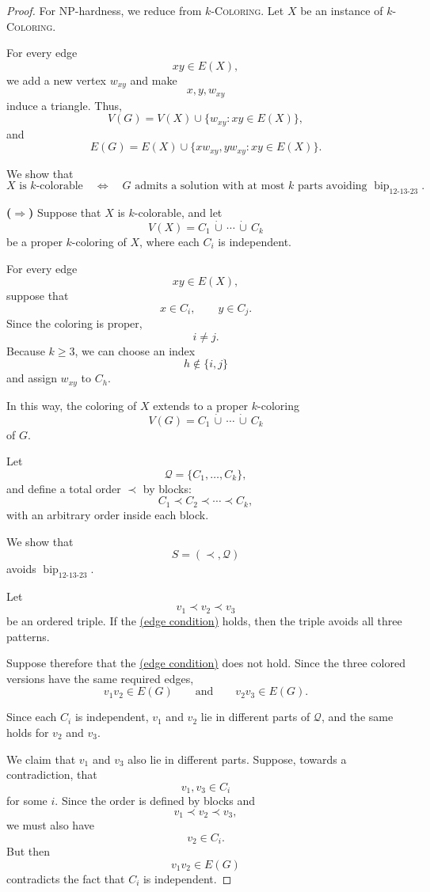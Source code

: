 \documentclass[12pt]{article}
\theoremstyle{plain}
\theoremstyle{definition}
\theoremstyle{remark}
\theoremstyle{definition}
\newcommand{\edgecondition}{%
  \hyperref[def:avoid:cond:edge]{(edge condition)}\xspace
}
\newcommand{\biplabel}{\mathrm{bip}}
\DeclareRobustCommand{\bipparam}[1]{%
  \ensuremath{\mathop{\biplabel}\nolimits_{#1}}%
}
\begin{document}
\begin{proof}
For NP-hardness, we reduce from \(k\)-\textsc{Coloring}.
Let \(X\) be an instance of \(k\)-\textsc{Coloring}.

For every edge
\[
xy\in E(X),
\]
we add a new vertex \(w_{xy}\) and make
\[
x,y,w_{xy}
\]
induce a triangle. Thus,
\[
V(G)
=
V(X)\cup\{w_{xy}:xy\in E(X)\},
\]
and
\[
E(G)
=
E(X)\cup
\{xw_{xy},yw_{xy}:xy\in E(X)\}.
\]

We show that
\[
X\text{ is \(k\)-colorable}
\quad\Longleftrightarrow\quad
G\text{ admits a solution with at most \(k\) parts avoiding }
\bipparam{12\text{-}13\text{-}23}.
\]

\medskip
\noindent\textbf{(\(\Rightarrow\))}
Suppose that \(X\) is \(k\)-colorable, and let
\[
V(X)=C_1\,\dot\cup\,\cdots\,\dot\cup\,C_k
\]
be a proper \(k\)-coloring of \(X\), where each \(C_i\) is independent.

For every edge
\[
xy\in E(X),
\]
suppose that
\[
x\in C_i,
\qquad
y\in C_j.
\]
Since the coloring is proper,
\[
i\neq j.
\]
Because \(k\ge3\), we can choose an index
\[
h\notin\{i,j\}
\]
and assign \(w_{xy}\) to \(C_h\).

In this way, the coloring of \(X\) extends to a proper \(k\)-coloring
\[
V(G)=C_1\,\dot\cup\,\cdots\,\dot\cup\,C_k
\]
of \(G\).

Let
\[
\mathcal Q=\{C_1,\dots,C_k\},
\]
and define a total order \(\prec\) by blocks:
\[
C_1\prec C_2\prec\cdots\prec C_k,
\]
with an arbitrary order inside each block.

We show that
\[
S=(\prec,\mathcal Q)
\]
avoids \(\bipparam{12\text{-}13\text{-}23}\).

Let
\[
v_1\prec v_2\prec v_3
\]
be an ordered triple. If the \edgecondition{} holds, then the triple avoids
all three patterns.

Suppose therefore that the \edgecondition{} does not hold. Since the three
colored versions have the same required edges,
\[
v_1v_2\in E(G)
\qquad\text{and}\qquad
v_2v_3\in E(G).
\]

Since each \(C_i\) is independent, \(v_1\) and \(v_2\) lie in different
parts of \(\mathcal Q\), and the same holds for \(v_2\) and \(v_3\).

We claim that \(v_1\) and \(v_3\) also lie in different parts. Suppose,
towards a contradiction, that
\[
v_1,v_3\in C_i
\]
for some \(i\). Since the order is defined by blocks and
\[
v_1\prec v_2\prec v_3,
\]
we must also have
\[
v_2\in C_i.
\]
But then
\[
v_1v_2\in E(G)
\]
contradicts the fact that \(C_i\) is independent.


\end{proof}
\end{document}
